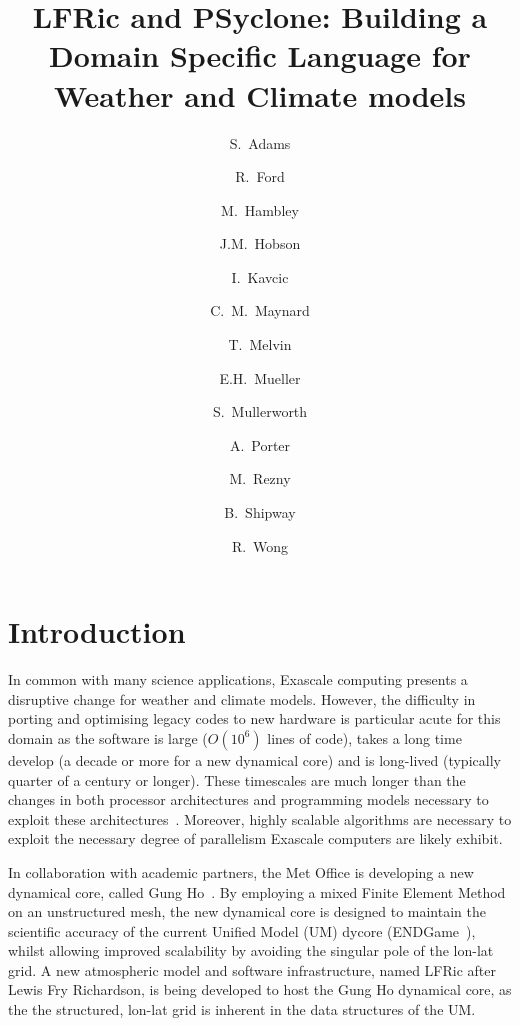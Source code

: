 \documentclass[times]{elsarticle}
\begin{document}
\begin{frontmatter}

\title{LFRic and PSyclone: Building a Domain Specific Language for Weather and Climate models}

\author[met]{S.~Adams}
\author[hartree]{R.~Ford}
\author[met]{M.~Hambley}
\author[met]{J.M.~Hobson}
\author[met]{I.~Kavcic}
\author[met,read]{C.~M.~Maynard}
\author[met]{T.~Melvin}
\author[bath]{E.H.~Mueller}
\author[met]{S.~Mullerworth}
\author[hartree]{A.~Porter}
\author[downunder]{M.~Rezny}
\author[met]{B.~Shipway}
\author[met]{R.~Wong}




\address[met]{Met Office, FitzRoy Road, Exeter, EX1 3PB}
\address[read]{Department of Computer Science, Polly Vacher Building,
  University of Reading, Reading, UK, RG6 6AY}
\address[bath]{Department of Mathematics, University of Bath, Bath}
\address[downunder]{Monash University, Melbourne, Australia}
\address[hartree]{Hartree Centre, STFC Daresbury, Grim up North}

\begin{abstract}
\end{abstract}

\begin{keyword}

\end{keyword}

\end{frontmatter}

\section{Introduction}
In common with many science applications, Exascale computing presents
a disruptive change for weather and climate models. However, the
difficulty in porting and optimising legacy codes to new hardware is
particular acute for this domain as the software is large ($O(10^6)$
lines of code), takes a long time develop (a decade or more for a new
dynamical core) and is long-lived (typically quarter of a century or longer). These
timescales are much longer than the changes in both processor
architectures and programming models necessary to exploit these
architectures~\cite{gmd-2017-186}. Moreover, highly scalable
algorithms are necessary to exploit the necessary degree of
parallelism Exascale computers are likely exhibit.

In collaboration with academic partners, the Met Office is developing
a new dynamical core, called Gung Ho~\cite{MELVIN2018342}. By
employing a mixed Finite Element Method on an unstructured mesh, the
new dynamical core is designed to maintain the scientific accuracy of
the current Unified Model (UM) dycore (ENDGame~\cite{QJ:QJ2235}),
whilst allowing improved scalability by avoiding the singular pole of
the lon-lat grid. A new atmospheric model and software infrastructure,
named LFRic after Lewis Fry Richardson, is being developed to host the
Gung Ho dynamical core, as the the structured, lon-lat grid is inherent in the
data structures of the UM.
\end{document}
